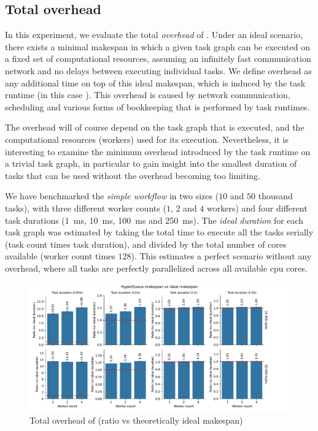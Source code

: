 \subsection{Total overhead}
\label{sec:hq-exp-total-overhead}
In this experiment, we evaluate the total \emph{overhead} of \hyperqueue{}. Under
an ideal scenario, there exists a minimal makespan in which a given task graph can be executed on a
fixed set of computational resources, assuming an infinitely fast communication network and no
delays between executing individual tasks. We define overhead as any additional time on top of this
ideal makespan, which is induced by the task runtime (in this case \hyperqueue{}). This
overhead is caused by network communication, scheduling and various forms of bookkeeping that is
performed by task runtimes.

The overhead will of course depend on the task graph that is executed, and the computational
resources (workers) used for its execution. Nevertheless, it is interesting to examine the minimum
overhead introduced by the task runtime on a trivial task graph, in particular to gain insight into
the smallest duration of tasks that can be used without the overhead becoming too limiting.

We have benchmarked the \emph{simple workflow} in two sizes ($10$ and
$50$ thousand tasks), with three different worker counts ($1$,
$2$ and $4$ workers) and four different task durations
(\SI{1}{\milli\second}, \SI{10}{\milli\second}, \SI{100}{\milli\second} and
\SI{250}{\milli\second}). The \emph{ideal duration} for each task graph was estimated by taking
the total time to execute all the tasks serially (task count times task duration), and divided by
the total number of cores available (worker count times $128$). This estimates a
perfect scenario without any overhead, where all tasks are perfectly parallelized across all
available \gls{cpu} cores.

\begin{figure}[h]
	\centering
	\includegraphics[width=\textwidth]{imgs/hq/charts/total-overhead-vs-ideal}
	\caption{Total overhead of \hyperqueue{} (ratio vs theoretically ideal makespan)}
	\label{fig:hq-overhead-vs-ideal}
\end{figure}


